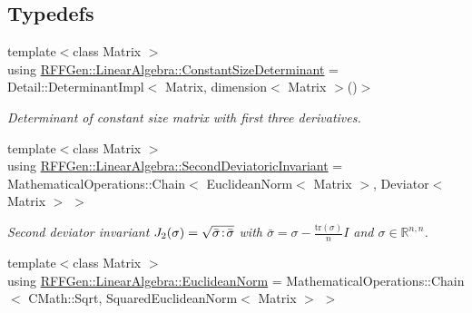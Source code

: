 \subsection*{Typedefs}
\begin{DoxyCompactItemize}
\item 
\hypertarget{group__LinearAlgebraGroup_ga3db2e748fee631cc5180eaf9d703e124}{{\footnotesize template$<$class Matrix $>$ }\\using \hyperlink{group__LinearAlgebraGroup_ga3db2e748fee631cc5180eaf9d703e124}{R\-F\-F\-Gen\-::\-Linear\-Algebra\-::\-Constant\-Size\-Determinant} = Detail\-::\-Determinant\-Impl$<$ Matrix, dimension$<$ Matrix $>$()$>$}\label{group__LinearAlgebraGroup_ga3db2e748fee631cc5180eaf9d703e124}

\begin{DoxyCompactList}\small\item\em Determinant of constant size matrix with first three derivatives. \end{DoxyCompactList}\item 
\hypertarget{group__LinearAlgebraGroup_gad7970e9633f69d0b8d0afd300209e63d}{{\footnotesize template$<$class Matrix $>$ }\\using \hyperlink{group__LinearAlgebraGroup_gad7970e9633f69d0b8d0afd300209e63d}{R\-F\-F\-Gen\-::\-Linear\-Algebra\-::\-Second\-Deviatoric\-Invariant} = Mathematical\-Operations\-::\-Chain$<$ Euclidean\-Norm$<$ Matrix $>$, Deviator$<$ Matrix $>$ $>$}\label{group__LinearAlgebraGroup_gad7970e9633f69d0b8d0afd300209e63d}

\begin{DoxyCompactList}\small\item\em Second deviator invariant $ J_2(\sigma)=\sqrt{\bar\sigma\negthinspace:\negthinspace\bar\sigma} $ with $\bar\sigma = \sigma - \frac{\mathrm{tr}(\sigma)}{n}I$ and $\sigma\in\mathbb{R}^{n,n}$. \end{DoxyCompactList}\item 
\hypertarget{group__LinearAlgebraGroup_gaee2184589f2dddd26f00bd695ebcd577}{{\footnotesize template$<$class Matrix $>$ }\\using \hyperlink{group__LinearAlgebraGroup_gaee2184589f2dddd26f00bd695ebcd577}{R\-F\-F\-Gen\-::\-Linear\-Algebra\-::\-Euclidean\-Norm} = Mathematical\-Operations\-::\-Chain$<$ C\-Math\-::\-Sqrt, Squared\-Euclidean\-Norm$<$ Matrix $>$ $>$}\label{group__LinearAlgebraGroup_gaee2184589f2dddd26f00bd695ebcd577}


\end{DoxyCompactItemize}
